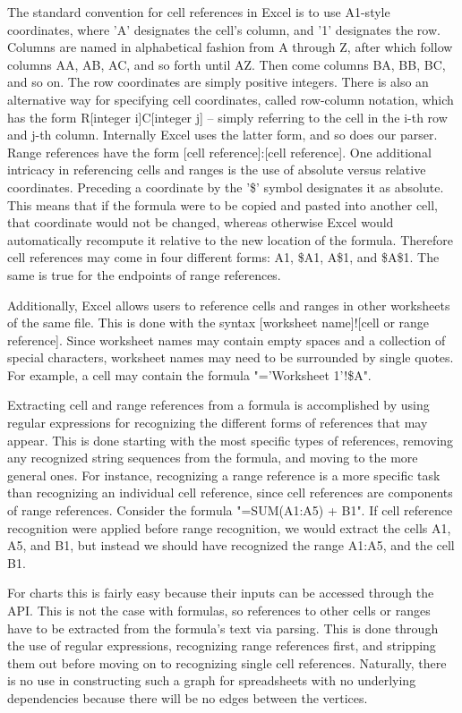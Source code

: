 The standard convention for cell references in Excel is to use A1-style 
coordinates, where 'A' designates the cell's column, and '1' designates 
the row.  Columns are named in alphabetical fashion from A through Z, 
after which follow columns AA, AB, AC, and so forth until AZ. Then come 
columns BA, BB, BC, and so on.  The row coordinates are simply positive 
integers.  There is also an alternative way for specifying cell 
coordinates, called row-column notation, which has the form 
R[integer i]C[integer j] -- simply referring to the cell in the i-th row 
and j-th column.  Internally Excel uses the latter form, and so does our 
parser.  Range references have the form [cell reference]:[cell reference].
One additional intricacy in referencing cells and ranges is the use of 
absolute versus relative coordinates.  Preceding a coordinate by the 
'\$' symbol designates it as absolute.  This means that if the formula 
were to be copied and pasted into another cell, that coordinate would not
be changed, whereas otherwise Excel would automatically recompute it
relative to the new location of the formula.  Therefore cell references
may come in four different forms: A1, \$A1, A\$1, and \$A\$1.  The same is 
true for the endpoints of range references.  

Additionally, Excel allows users to reference cells and ranges in other 
worksheets of the same file. This is done with the syntax 
[worksheet name]![cell or range reference]. Since worksheet names may contain
empty spaces and a collection of special characters, worksheet names may 
need to be surrounded by single quotes.  For example, a cell may contain the 
formula "='Worksheet 1'!\$A\1".

Extracting cell and range references from a formula is accomplished by 
using regular expressions for recognizing the different forms of references
that may appear.  This is done starting with the most specific types of 
references, removing any recognized string sequences from the formula, 
and moving to the more general ones.  For instance, recognizing a range 
reference is a more specific task than recognizing an individual cell
reference, since cell references are components of range references.  Consider
the formula "=SUM(A1:A5) + B1". If cell reference recognition were applied 
before range recognition, we would extract the cells A1, A5, and B1, but instead
we should have recognized the range A1:A5, and the cell B1. 

For charts this is fairly easy because their
inputs can be accessed through the API.  This is not the case with
formulas, so references to other cells or ranges have to be extracted
from the formula's text via parsing.  This is done through the use
of regular expressions, recognizing range references first, and
stripping them out before moving on to recognizing single cell
references.  Naturally, there is no use in constructing such a graph
for spreadsheets with no underlying dependencies because there will be
no edges between the vertices.

